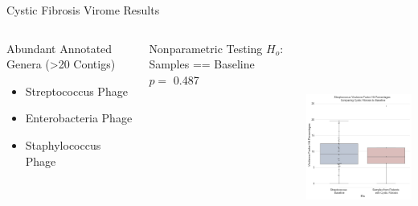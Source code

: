 \documentclass[11pt]{beamer}
\begin{document}
	\begin{frame}{Cystic Fibrosis Virome Results}
	\begin{columns}
	\hspace{2cm}
	\begin{block}{Abundant Annotated Genera (>20 Contigs)}
	\begin{itemize}
	\item \alert{Streptococcus Phage}
	\item Enterobacteria Phage
	\item Staphylococcus Phage
  \end{itemize}
  \end{block}
  
  \begin{block}{Nonparametric Testing}
  $H_o$: Samples == Baseline \\
  \vspace{0.2cm}
  $p =$ 0.487
  \end{block}
	
	
	
	
	\centering
	\includegraphics[height=7cm, width=6cm]{CF_Comparison.jpg}
	
	
	\end{columns}
	
	\end{frame}
\end{document}
